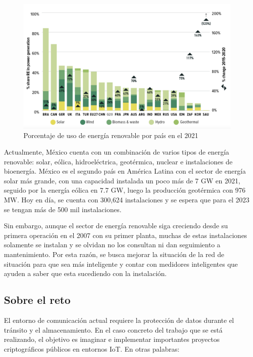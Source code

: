\documentclass{article}
\begin{document}
            \begin{figure}[h]
                \centering
                \includegraphics[scale = 0.30]{img/energiaMundo.png}
                \caption{Porcentaje de uso de energía renovable por país en el 2021 \cite{climate_transparency}}
                \label{fig:energiaM}
            \end{figure}

            Actualmente, México cuenta con un combinación de varios tipos de energía renovable: solar, eólica, hidroeléctrica, geotérmica, nuclear e instalaciones de bioenergía. México es el segundo país en América Latina con el sector de energía solar más grande, con una capacidad instalada un poco más de 7 GW en 2021, seguido por la energía eólica en 7.7 GW, luego la producción geotérmica con 976 MW. \cite{mexico} Hoy en día, se cuenta con 300,624 instalaciones y se espera que para el 2023 se tengan más de 500 mil instalaciones.

            Sin embargo, aunque el sector de energía renovable siga creciendo desde su primera operación en el 2007 con su primer planta, muchas de estas instalaciones solamente se instalan y se olvidan no los consultan ni dan seguimiento a mantenimiento. Por esta razón, se busca mejorar la situación de la red de situación para que sea más inteligente y contar con medidores inteligentes que ayuden a saber que esta sucediendo con la instalación.

        \subsection{Sobre el reto}

            El entorno de comunicación actual requiere la protección de datos durante el tránsito y el almacenamiento. En el caso concreto del trabajo que se está realizando, el objetivo es imaginar e implementar importantes proyectos criptográficos públicos en entornos IoT. En otras palabras:
\end{document}
